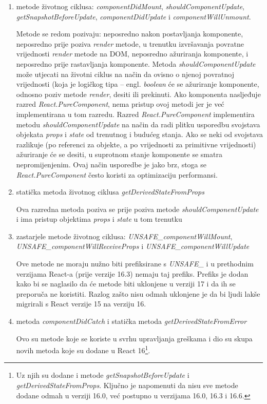 \documentclass[times, utf8, diplomski, numeric]{fer}
\newcommand{\razmaks}{\vspace{10pt}}
\begin{document}
\begin{enumerate}[label=(\alph*)]
    \item metode životnog ciklusa: \emph{componentDidMount}, \emph{shouldComponentUpdate},
    \break \emph{getSnapshotBeforeUpdate}, \emph{componentDidUpdate} i \emph{componentWillUnmount}.
    
    Metode se redom pozivaju: neposredno nakon postavljanja komponente, neposredno prije poziva \emph{render} metode, u trenutku izvršavanja  povratne vrijednosti \emph{render} metode na DOM, neposredno ažuriranja komponente, i neposredno prije rastavljanja komponente.
    Metoda \emph{shouldComponentUpdate} može utjecati na životni ciklus na način da ovisno o njenoj povratnoj vrijednosti (koja je logičkog tipa – engl. \emph{boolean} će se ažuriranje komponente, odnosno poziv metode \emph{render}, desiti ili prekinuti.
    Ako komponenta nasljeđuje razred \emph{React.PureComponent}, nema pristup ovoj metodi jer je već implementirana u tom razredu.
    Razred \emph{React.PureComponent} implementira metodu \emph{shouldComponentUpdate} na način da radi plitku usporedbu  svojstava objekata \emph{props} i \emph{state} od trenutnog i budućeg stanja. Ako se neki od svojstava razlikuje (po referenci za objekte, a po vrijednosti za primitivne vrijednosti) ažuriranje će se desiti, u suprotnom stanje komponente se smatra nepromijenjenim. Ovaj način usporedbe je jako brz, stoga se \emph{React.PureComponent} često koristi za optimizaciju performansi\citep{react_docs}.

    \item statička metoda životnog ciklusa \emph{getDerivedStateFromProps}
    
    Ova razredna metoda poziva se prije poziva metode \emph{shouldComponentUpdate} i ima pristup objektima \emph{props} i \emph{state} u tom trenutku

    \item zastarjele metode životnog ciklusa: \emph{UNSAFE\_componentWillMount},
    \break \emph{UNSAFE\_componentWillReceiveProps} i \emph{UNSAFE\_componentWillUpdate}

    Ove metode ne moraju nužno biti prefiksirane s \emph{UNSAFE\_} i u prethodnim verzijama React-a (prije verzije 16.3) nemaju taj prefiks.
    Prefiks je dodan kako bi se naglasilo da će metode biti uklonjene u verziji 17 i da ih se preporuča ne koristiti.
    Razlog zašto nisu odmah uklonjene je da bi ljudi lakše migrirali s React verzije 15 na verziju 16\citep{react_16_3}.

    \item metoda \emph{componentDidCatch} i statička metoda \emph{getDerivedStateFromError}
    
    Ovo su metode koje se koriste u svrhu upravljanja greškama  i dio su skupa novih metoda koje su dodane u React 16\footnote{
        Uz njih su dodane i metode \emph{getSnapshotBeforeUpdate} i \emph{getDerivedStateFromProps}. Ključno je napomenuti da nisu sve metode dodane odmah u verziji 16.0, već postupno u verzijama 16.0, 16.3 i 16.6\citep{gh_react_changelog}.
    }\citep{react_error}.
\end{enumerate}
\razmaks
\end{document}
